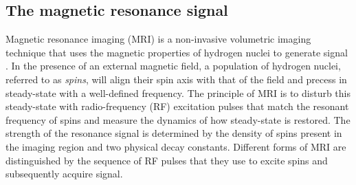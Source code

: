 \subsection{The magnetic resonance signal}

Magnetic resonance imaging (MRI) is a non-invasive volumetric imaging technique that uses the magnetic properties of hydrogen nuclei to generate signal \cite{bushberg2011}. In the presence of an external magnetic field, a population of hydrogen nuclei, referred to as \textit{spins}, will align their spin axis with that of the field and precess in steady-state with a well-defined frequency. The principle of MRI is to disturb this steady-state with radio-frequency (RF) excitation pulses that match the resonant frequency of spins and measure the dynamics of how steady-state is restored. The strength of the resonance signal is determined by the density of spins present in the imaging region and two physical decay constants. Different forms of MRI are distinguished by the sequence of RF pulses that they use to excite spins and subsequently acquire signal. 




